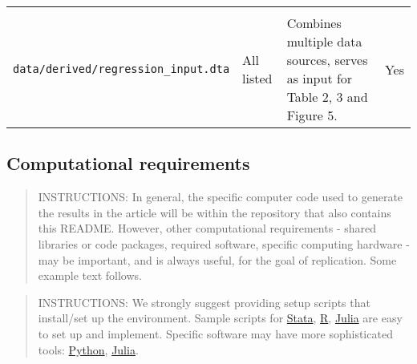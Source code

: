 \documentclass[
]{article}
\begin{document}
\begin{longtable}[]{@{}llll@{}}
\begin{minipage}[t]{0.21\columnwidth}
\end{minipage}\tabularnewline
\begin{minipage}[t]{0.26\columnwidth}\raggedright
\texttt{data/derived/regression\_input.dta}\strut
\end{minipage} & \begin{minipage}[t]{0.19\columnwidth}\raggedright
All listed\strut
\end{minipage} & \begin{minipage}[t]{0.23\columnwidth}\raggedright
Combines multiple data sources, serves as input for Table 2, 3 and
Figure 5.\strut
\end{minipage} & \begin{minipage}[t]{0.21\columnwidth}\raggedright
Yes\strut
\end{minipage}\tabularnewline
\bottomrule
\end{longtable}

\hypertarget{computational-requirements}{%
\subsection{Computational
requirements}\label{computational-requirements}}

\begin{quote}
INSTRUCTIONS: In general, the specific computer code used to generate
the results in the article will be within the repository that also
contains this README. However, other computational requirements - shared
libraries or code packages, required software, specific computing
hardware - may be important, and is always useful, for the goal of
replication. Some example text follows.
\end{quote}

\begin{quote}
INSTRUCTIONS: We strongly suggest providing setup scripts that
install/set up the environment. Sample scripts for
\href{https://github.com/gslab-econ/template/blob/master/config/config_stata.do}{Stata},
\href{https://github.com/labordynamicsinstitute/paper-template/blob/master/programs/global-libraries.R}{R},
\href{https://github.com/labordynamicsinstitute/paper-template/blob/master/programs/packages.jl}{Julia}
are easy to set up and implement. Specific software may have more
sophisticated tools:
\href{https://pip.pypa.io/en/stable/user_guide/\#ensuring-repeatability}{Python},
\href{https://julia.quantecon.org/more_julia/tools_editors.html\#Package-Environments}{Julia}.
\end{quote}
\end{document}
